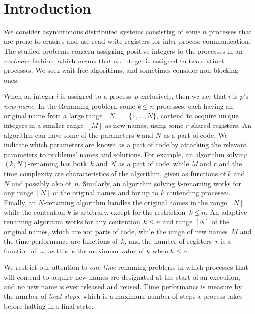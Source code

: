 \documentclass[11pt]{article}
\begin{document}
\vfill

~

\thispagestyle{empty}

\setcounter{page}{0}
\newpage




\section{Introduction}




We consider asynchronous distributed systems consisting of some $n$ processes that are prone to crashes and use read-write registers for inter-process communication.
The studied problems concern assigning positive integers to the processes in an \emph{exclusive} fashion, which means that no integer is assigned to two distinct processes.
We seek wait-free algorithms, and sometimes consider non-blocking ones.

When an integer $i$ is assigned to a process~$p$ exclusively, then we say that $i$ is $p$'s  \emph{new name}. 
In the Renaming problem, some $k\le n$ processes, each having an original name from a large range $[N]=\{1,\ldots,N\}$, contend to acquire unique integers in a smaller range~$[M]$  as new names, using some $r$ shared registers.
An algorithm can have some of the parameters $k$ and $N$ as a part of code.
We indicate which parameters are known as a part of code by attaching the relevant parameters to problems' names and solutions.
For example, an algorithm solving $(k,N)$-renaming has both~$k$ and~$N$ as a part of code, while $M$ and $r$ and the time complexity are characteristics of the algorithm, given as functions of $k$ and $N$ and possibly also of~$n$.
Similarly, an algorithm solving $k$-renaming works for any range $[N]$ of the original names and for up to $k$ contending processes.
Finally, an $N$-renaming algorithm handles the original names in the range $[N]$ while the contention $k$ is arbitrary, except for the restriction~$k\le n$.
An adaptive renaming algorithm works for any contention~$k\le n$ and range $[N]$ of the original names, which are not parts of code, while the range of new names~$M$ and the time performance are  functions of~$k$, and the number of registers~$r$ is a function of~$n$, as this is the maximum value of $k$ when $k\le n$.

We restrict our attention to \emph{one-time} renaming problems in which processes that will contend to acquire new names are designated at the start of an execution, and no new name is ever released and reused. 
Time performance is measure by the number of \emph{local steps}, which is a maximum number of steps a process takes before halting in a final state.
\end{document}
